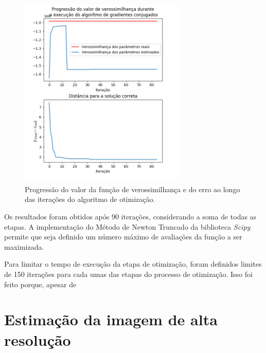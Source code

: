 


\begin{figure}[h]
	\centering
	\includegraphics[width=0.7\textwidth]{./figures/results_figures/progression_plot.png}
	\caption{Progressão do valor da função de verossimilhança e do erro ao longo das iterações do algoritmo de otimização.}
	\label{fig:progression}
\end{figure}

Os resultados foram obtidos após 90 iterações, considerando a soma de todas as etapas.
A implementação do Método de Newton Truncado da biblioteca \emph{Scipy} permite
que seja definido um número máximo de avaliações da função a ser maximizada.

Para limitar o tempo de execução da etapa de otimização, foram definidos limites de 150 iterações para cada umas das etapas do processo de otimização.
Isso foi feito porque, apesar de 

\section{Estimação da imagem de alta resolução}

